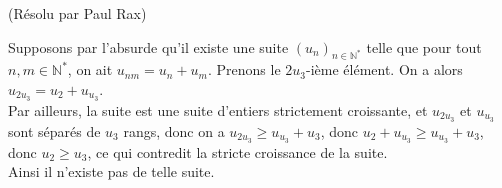\begin{sol}[130](Résolu par Paul Rax)

Supposons par l'absurde qu'il existe une suite $(u_n)_{n \in \mathbb{N}^*}$ telle que pour tout $n,m \in \mathbb{N}^*$, on ait
$u_{nm}=u_n+u_m$. Prenons le $2u_3$-i\`eme \'el\'ement. On a alors $u_{2u_3}=u_2+u_{u_3}$.\\
Par ailleurs, la suite est une suite d'entiers strictement croissante, et $u_{2u_3}$ et $u_{u_3}$ sont s\'epar\'es de $u_3$ rangs,
donc on a $u_{2u_3} \geq u_{u_3} +u_3$, donc $u_2+u_{u_3} \geq u_{u_3} +u_3$, donc $u_2 \geq u_3$, ce qui contredit la stricte croissance de la suite.\\
Ainsi il n'existe pas de telle suite.

\end{sol}



